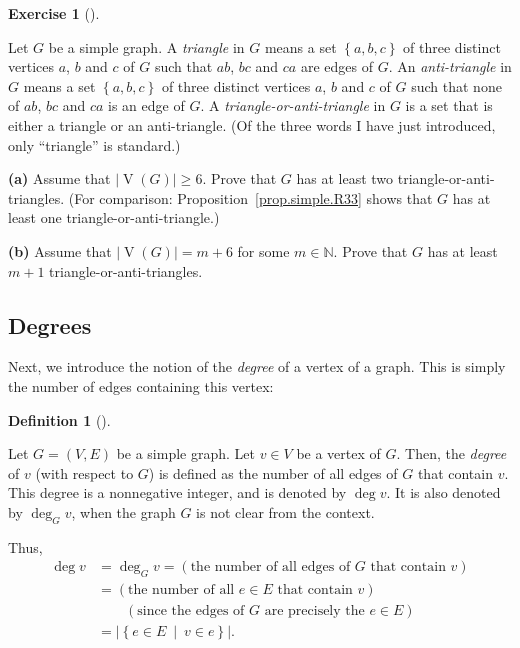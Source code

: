 \documentclass[numbers=enddot,12pt,final,onecolumn,notitlepage]{scrartcl}%
\theoremstyle{definition}
\newtheorem{defi}[theo]{Definition}
\newenvironment{definition}[1][]
{\begin{defi}[#1]\begin{leftbar}}
{\end{leftbar}\end{defi}}
\newtheorem{exmp}[theo]{Exercise}
\newenvironment{exercise}[1][]
{\begin{exmp}[#1]\begin{leftbar}}
{\end{leftbar}\end{exmp}}
\newcommand{\NN}{\mathbb{N}}
\newcommand{\set}[1]{\left\{ #1 \right\}}
\newcommand{\abs}[1]{\left| #1 \right|}
\newcommand{\tup}[1]{\left( #1 \right)}
\newcommand{\verts}[1]{\operatorname{V}\left( #1 \right)}
\begin{document}
\begin{exercise} \label{exa.simple.R33.two}
Let $G$ be a simple graph. A \textit{triangle} in $G$ means a set
$\set{a, b, c}$ of three distinct vertices $a$, $b$ and $c$ of $G$
such that $ab$, $bc$ and $ca$ are edges of $G$. An
\textit{anti-triangle} in $G$ means a set $\set{a, b, c}$ of three
distinct vertices $a$, $b$ and $c$ of $G$ such that none of $ab$, $bc$
and $ca$ is an edge of $G$. A \textit{triangle-or-anti-triangle} in
$G$ is a set that is either a triangle or an anti-triangle.
(Of the three words I have just introduced, only ``triangle'' is
standard.) 

\textbf{(a)} Assume that $\abs{\verts{G}}\geq 6$.
Prove that $G$ has at least two
triangle-or-anti-triangles. (For comparison:
Proposition~\ref{prop.simple.R33} shows that $G$ has at least one
triangle-or-anti-triangle.)

\textbf{(b)} Assume that $\abs{\verts{G}} = m+6$ for some
$m \in \NN$. Prove that $G$ has at least $m+1$
triangle-or-anti-triangles.
\end{exercise}

\subsection{\label{sect.intro.deg}Degrees}

Next, we introduce the notion of the \textit{degree} of a vertex of a
graph. This is simply the number of edges containing this vertex:

\begin{definition} \label{def.intro.deg}
Let $G = \tup{V, E}$ be a simple graph. Let $v \in V$ be a vertex of
$G$. Then, the \textit{degree} of $v$ (with respect to $G$) is defined
as the number of all edges of $G$ that contain $v$.
This degree is a nonnegative integer, and is denoted by $\deg v$. It
is also denoted by $\deg_G v$, when the graph $G$ is not clear from
the context.

Thus,
\begin{align}
\deg v &= \deg_G v =
\left(\text{the number of all edges of } G \text{ that contain } v
\right)
\label{eq.def.intro.deg.0a} \\
&=
\left(\text{the number of all } e \in E \text{ that contain } v
\right)
\label{eq.def.intro.deg.0b} \\
& \qquad
\left(\text{since the edges of } G \text{ are precisely the } e \in E
\right) \nonumber \\
&= \abs{\set{e \in E \ \mid \ v \in e }} .
\label{eq.def.intro.deg.0c}
\end{align}
\end{definition}
\end{document}

